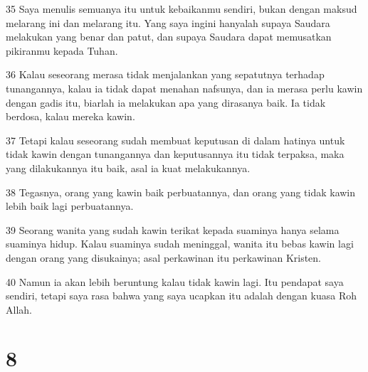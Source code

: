 \par 35 Saya menulis semuanya itu untuk kebaikanmu sendiri, bukan dengan maksud melarang ini dan melarang itu. Yang saya ingini hanyalah supaya Saudara melakukan yang benar dan patut, dan supaya Saudara dapat memusatkan pikiranmu kepada Tuhan.
\par 36 Kalau seseorang merasa tidak menjalankan yang sepatutnya terhadap tunangannya, kalau ia tidak dapat menahan nafsunya, dan ia merasa perlu kawin dengan gadis itu, biarlah ia melakukan apa yang dirasanya baik. Ia tidak berdosa, kalau mereka kawin.
\par 37 Tetapi kalau seseorang sudah membuat keputusan di dalam hatinya untuk tidak kawin dengan tunangannya dan keputusannya itu tidak terpaksa, maka yang dilakukannya itu baik, asal ia kuat melakukannya.
\par 38 Tegasnya, orang yang kawin baik perbuatannya, dan orang yang tidak kawin lebih baik lagi perbuatannya.
\par 39 Seorang wanita yang sudah kawin terikat kepada suaminya hanya selama suaminya hidup. Kalau suaminya sudah meninggal, wanita itu bebas kawin lagi dengan orang yang disukainya; asal perkawinan itu perkawinan Kristen.
\par 40 Namun ia akan lebih beruntung kalau tidak kawin lagi. Itu pendapat saya sendiri, tetapi saya rasa bahwa yang saya ucapkan itu adalah dengan kuasa Roh Allah.

\chapter{8}

